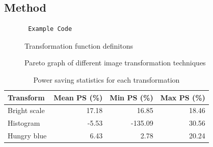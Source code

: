 \documentclass[11pt,a4paper]{article}
\begin{document}
\subsection{Method}










\begin{figure}[h]
\centering
\begin{lstlisting}
 Example Code
\end{lstlisting}
\caption{Transformation function definitons}
\label{fig:transformation_defs}
\end{figure}


\graphicspath{{images}}
\begin{figure}[H]
  \centering
  \caption{Pareto graph of different image transformation techniques}
  \label{fig:pareto_graph1}
\end{figure}



\begin{table}[htbp]
\centering
\caption{Power saving statistics for each transformation}
\label{tab:power_saving_stats}
\begin{tabular}{lrrr}
\toprule
\textbf{Transform} &
\textbf{Mean PS (\%)} &
\textbf{Min PS (\%)} &
\textbf{Max PS (\%)} \\
\midrule
Bright scale & 17.18 & 16.85 & 18.46 \\
Histogram    & -5.53 & -135.09 & 30.56 \\
Hungry blue  & 6.43 & 2.78 & 20.24 \\
\bottomrule
\end{tabular}
\end{table}


\end{document}
